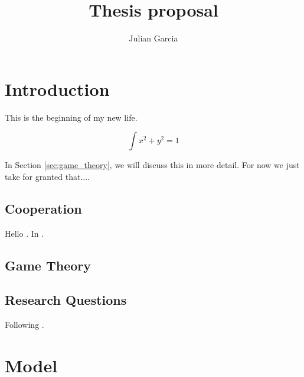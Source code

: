 \documentclass[11pt]{report}
\title{Thesis proposal}
\author{Julian Garcia}
\begin{document}
\maketitle

\chapter{Introduction}

This is the beginning of my new life.

$$\int x^2 + y ^2 = 1$$

In Section \ref{sec:game_theory}, we will discuss this in more detail.
For now we just take for granted that.... 

\section{Cooperation}

Hello \cite{garcia:JTB:2012}. In \cite{herron:SciRep:2019}.

\section{Game Theory \label{sec:game_theory}}

\section{Research Questions}

Following \cite{eberhart:CEC:2001}.

\chapter{Model}



\end{document}
